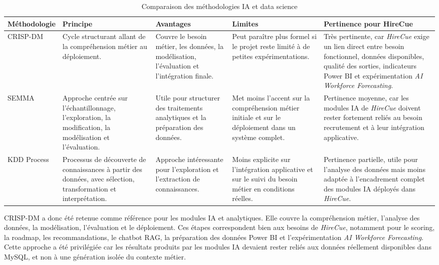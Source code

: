 \begin{table}[H]
\centering
\small
\renewcommand{\arraystretch}{1.25}
\begin{tabular}{|p{2.8cm}|p{2.8cm}|p{3.1cm}|p{3cm}|p{3.3cm}|}
\hline
\rowcolor{TableHeaderBlue}
\textbf{Méthodologie} & \textbf{Principe} & \textbf{Avantages} & \textbf{Limites} & \textbf{Pertinence pour HireCue} \\
\hline
CRISP-DM & Cycle structurant allant de la compréhension métier au déploiement. & Couvre le besoin métier, les données, la modélisation, l'évaluation et l'intégration finale. & Peut paraître plus formel si le projet reste limité à de petites expérimentations. & Très pertinente, car \textit{HireCue} exige un lien direct entre besoin fonctionnel, données disponibles, qualité des sorties, indicateurs Power BI et expérimentation \textit{AI Workforce Forecasting}. \\
\hline
SEMMA & Approche centrée sur l'échantillonnage, l'exploration, la modification, la modélisation et l'évaluation. & Utile pour structurer des traitements analytiques et la préparation des données. & Met moins l'accent sur la compréhension métier initiale et sur le déploiement dans un système complet. & Pertinence moyenne, car les modules IA de \textit{HireCue} doivent rester fortement reliés au besoin recrutement et à leur intégration applicative. \\
\hline
KDD Process & Processus de découverte de connaissances à partir des données, avec sélection, transformation et interprétation. & Approche intéressante pour l'exploration et l'extraction de connaissances. & Moins explicite sur l'intégration applicative et sur le suivi du besoin métier en conditions réelles. & Pertinence partielle, utile pour l'analyse des données mais moins adaptée à l'encadrement complet des modules IA déployés dans \textit{HireCue}. \\
\hline
\end{tabular}
\caption{Comparaison des méthodologies IA et data science}
\end{table}
\normalsize

CRISP-DM a donc été retenue comme référence pour les modules IA et analytiques. Elle couvre la compréhension métier, l'analyse des données, la modélisation, l'évaluation et le déploiement. Ces étapes correspondent bien aux besoins de \textit{HireCue}, notamment pour le scoring, la roadmap, les recommandations, le chatbot RAG, la préparation des données Power BI et l'expérimentation \textit{AI Workforce Forecasting}. Cette approche a été privilégiée car les résultats produits par les modules IA devaient rester reliés aux données réellement disponibles dans MySQL, et non à une génération isolée du contexte métier.

